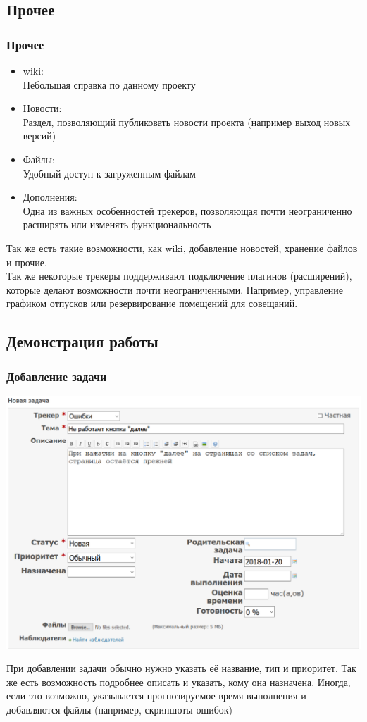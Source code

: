 \documentclass{../industrial-development}
\begin{document}
\subsection{Прочее}
\begin{frame} \frametitle{Прочее}
	\begin{itemize}
		\item wiki:\\
		Небольшая справка по данному проекту		
		\item Новости:\\
		Раздел, позволяющий публиковать новости проекта (например выход новых версий)
		\item Файлы:\\
		Удобный доступ к загруженным файлам
		\item Дополнения:\\
		Одна из важных особенностей трекеров, позволяющая почти неограниченно расширять или изменять функциональность
	\end{itemize}
\end{frame}
\lecturenotes
Так же есть такие возможности, как wiki, добавление новостей, хранение файлов и прочие.\\
Так же некоторые трекеры поддерживают подключение плагинов (расширений), которые делают возможности почти неограниченными. Например, управление графиком отпусков или резервирование помещений для совещаний.

\subsection{Демонстрация работы}
\begin{frame} \frametitle{Добавление задачи}
\centerline{\includegraphics[width=\textwidth]{adding.png}}
\end{frame}
\lecturenotes
При добавлении задачи обычно нужно указать её название, тип и приоритет. Так же есть возможность подробнее описать и указать, кому она назначена. Иногда, если это возможно, указывается прогнозируемое время выполнения и добавляются файлы (например, скриншоты ошибок)
\end{document}
